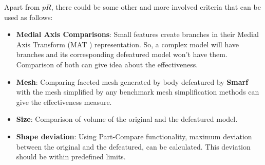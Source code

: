 Apart from $pR$, there could be some other and more involved criteria that can be used as follows:
	\begin{itemize}
	[noitemsep,topsep=2pt,parsep=2pt,partopsep=2pt]
	\item \textbf{Medial Axis Comparisons}: Small features create branches in their Medial Axis Transform (MAT \cite{Ramanathan2004})  representation. So, a complex model will have branches and its corresponding defeatured model won't have them. Comparison of both can give idea about the effectiveness.
	\item \textbf{Mesh}: Comparing faceted mesh generated by body defeatured by {\bf Smarf} with the mesh simplified by any benchmark mesh simplification methods can give the effectiveness measure.
	\item \textbf{Size}: Comparison of volume of the original and the defeatured model.
	\item \textbf{Shape deviation}: Using Part-Compare functionality, maximum deviation between the original and the defeatured, can be calculated. This deviation should be within predefined limits.
\end{itemize}



